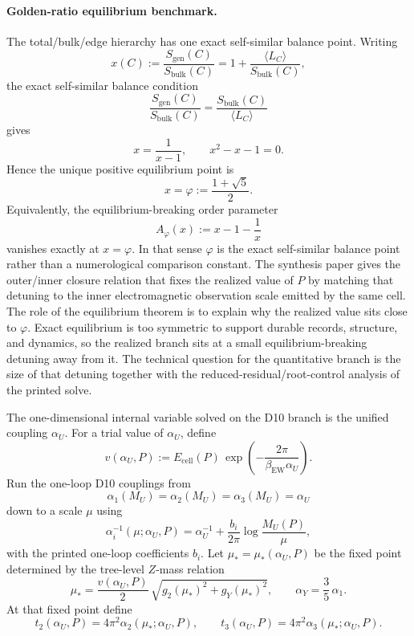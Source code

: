 \documentclass[11pt]{article}
\begin{document}
\paragraph{Golden-ratio equilibrium benchmark.}
The total/bulk/edge hierarchy has one exact self-similar balance point. Writing
\[
x(C):=\frac{S_{\mathrm{gen}}(C)}{S_{\mathrm{bulk}}(C)}
=
1+\frac{\langle L_C\rangle}{S_{\mathrm{bulk}}(C)},
\]
the exact self-similar balance condition
\[
\frac{S_{\mathrm{gen}}(C)}{S_{\mathrm{bulk}}(C)}
=
\frac{S_{\mathrm{bulk}}(C)}{\langle L_C\rangle}
\]
gives
\[
x=\frac{1}{x-1},
\qquad
x^2-x-1=0.
\]
Hence the unique positive equilibrium point is
\[
x=\varphi:=\frac{1+\sqrt5}{2}.
\]
Equivalently, the equilibrium-breaking order parameter
\[
A_\varphi(x):=x-1-\frac1x
\]
vanishes exactly at \(x=\varphi\). In that sense \(\varphi\) is the exact self-similar balance
point rather than a numerological comparison constant. The synthesis paper gives the outer/inner
closure relation that fixes the realized value of \(P\) by matching that detuning to the inner
electromagnetic observation scale emitted by the same cell. The role of the equilibrium theorem is
to explain why the realized value sits close to \(\varphi\). Exact equilibrium is too symmetric to
support durable records, structure, and dynamics, so the realized branch sits at a small
equilibrium-breaking detuning away from it. The technical question for the quantitative branch is
the size of that detuning together with the reduced-residual/root-control analysis of the printed
solve.

The one-dimensional internal variable solved on the D10 branch is the unified coupling \(\alpha_U\). For a trial value of \(\alpha_U\), define
\[
v(\alpha_U,P)
:=
E_{\mathrm{cell}}(P)\,
\exp\!\left(-\frac{2\pi}{\beta_{\mathrm{EW}}\alpha_U}\right).
\]
Run the one-loop D10 couplings from
\[
\alpha_1(M_U)=\alpha_2(M_U)=\alpha_3(M_U)=\alpha_U
\]
down to a scale \(\mu\) using
\[
\alpha_i^{-1}(\mu;\alpha_U,P)
=
\alpha_U^{-1}
+
\frac{b_i}{2\pi}\log\frac{M_U(P)}{\mu},
\]
with the printed one-loop coefficients \(b_i\). Let \(\mu_\ast=\mu_\ast(\alpha_U,P)\) be the fixed point determined by the tree-level \(Z\)-mass relation
\[
\mu_\ast
=
\frac{v(\alpha_U,P)}{2}\,
\sqrt{g_2(\mu_\ast)^2+g_Y(\mu_\ast)^2},
\qquad
\alpha_Y=\frac35\,\alpha_1.
\]
At that fixed point define
\[
t_2(\alpha_U,P)=4\pi^2\alpha_2(\mu_\ast;\alpha_U,P),
\qquad
t_3(\alpha_U,P)=4\pi^2\alpha_3(\mu_\ast;\alpha_U,P).
\]
\end{document}
